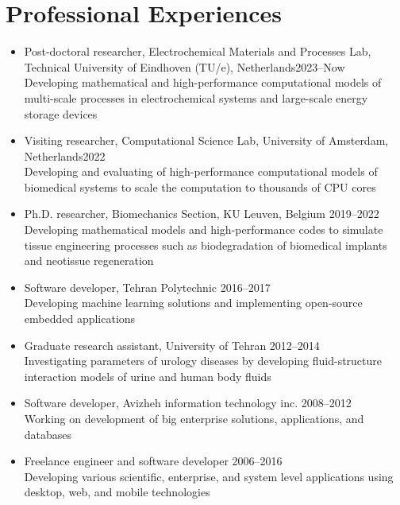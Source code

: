 \documentclass{cv}
\begin{document}

\section{Professional Experiences}

\begin{itemize}[itemsep=-0.2ex]
\item
Post-doctoral researcher, Electrochemical Materials and Processes Lab, Technical University of Eindhoven (TU/e), Netherlands\hfill 2023--Now
\\
Developing mathematical and high-performance computational models of multi-scale processes in electrochemical systems and large-scale energy storage devices
\item
Visiting researcher, Computational Science Lab, University of Amsterdam, Netherlands\hfill 2022
\\
Developing and evaluating of high-performance computational models of biomedical systems to scale the computation to thousands of CPU cores
\item
Ph.D. researcher, Biomechanics Section, KU Leuven, Belgium \hfill 2019--2022
\\
Developing mathematical models and high-performance codes to simulate tissue engineering processes such as biodegradation of biomedical implants and neotissue regeneration 
\item
Software developer, Tehran Polytechnic \hfill 2016--2017
\\
Developing machine learning solutions and implementing open-source embedded applications
\item
Graduate research assistant, University of Tehran \hfill 2012--2014
\\
Investigating parameters of urology diseases by developing fluid-structure interaction models of urine and human body fluids
\item Software developer, Avizheh information technology inc. \hfill 2008--2012
\\
Working on development of big enterprise solutions, applications, and databases
\item
Freelance engineer and software developer \hfill 2006--2016
\\
Developing various scientific, enterprise, and system level applications using desktop, web, and mobile technologies

\end{itemize}
\end{document}
